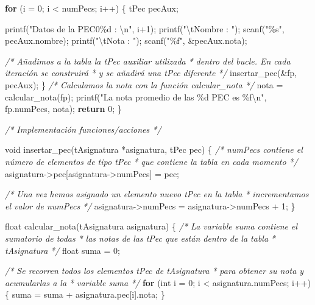 \documentclass[
]{book}
\newenvironment{Shaded}{\begin{snugshade}}{\end{snugshade}}
\newcommand{\CommentTok}[1]{\textcolor[rgb]{0.56,0.35,0.01}{\textit{#1}}}
\newcommand{\ControlFlowTok}[1]{\textcolor[rgb]{0.13,0.29,0.53}{\textbf{#1}}}
\newcommand{\DataTypeTok}[1]{\textcolor[rgb]{0.13,0.29,0.53}{#1}}
\newcommand{\DecValTok}[1]{\textcolor[rgb]{0.00,0.00,0.81}{#1}}
\newcommand{\NormalTok}[1]{#1}
\newcommand{\SpecialCharTok}[1]{\textcolor[rgb]{0.00,0.00,0.00}{#1}}
\newcommand{\StringTok}[1]{\textcolor[rgb]{0.31,0.60,0.02}{#1}}
\begin{document}
\begin{Shaded}
\begin{Highlighting}[]
    \ControlFlowTok{for}\NormalTok{ (i = }\DecValTok{0}\NormalTok{; i \textless{} numPecs; i++) \{}
\NormalTok{        tPec pecAux;}

\NormalTok{        printf(}\StringTok{"Datos de la PEC0\%d : }\SpecialCharTok{\textbackslash{}n}\StringTok{"}\NormalTok{, i+}\DecValTok{1}\NormalTok{);}
\NormalTok{        printf(}\StringTok{"}\SpecialCharTok{\textbackslash{}t}\StringTok{Nombre : "}\NormalTok{);}
\NormalTok{        scanf(}\StringTok{"\%s"}\NormalTok{, pecAux.nombre);}
\NormalTok{        printf(}\StringTok{"}\SpecialCharTok{\textbackslash{}t}\StringTok{Nota : "}\NormalTok{);}
\NormalTok{        scanf(}\StringTok{"\%f"}\NormalTok{, \&pecAux.nota);}

        \CommentTok{/* Añadimos a la tabla la tPec auxiliar utilizada}
\CommentTok{         * dentro del bucle. En cada iteración se construirá}
\CommentTok{         * y se añadirá una tPec diferente}
\CommentTok{         */}
\NormalTok{        insertar\_pec(\&fp, pecAux);}
\NormalTok{    \}}
    \CommentTok{/* Calculamos la nota con la función calcular\_nota */}
\NormalTok{    nota = calcular\_nota(fp);}
\NormalTok{    printf(}\StringTok{"La nota promedio de las \%d PEC es \%f}\SpecialCharTok{\textbackslash{}n}\StringTok{"}\NormalTok{, fp.numPecs, nota);}
    \ControlFlowTok{return} \DecValTok{0}\NormalTok{;}
\NormalTok{\}}

\CommentTok{/* Implementación funciones/acciones */}

\DataTypeTok{void}\NormalTok{ insertar\_pec(tAsignatura *asignatura, tPec pec) \{}
    \CommentTok{/* numPecs contiene el número de elementos de tipo tPec}
\CommentTok{     * que contiene la tabla en cada momento}
\CommentTok{     */}
\NormalTok{    asignatura{-}\textgreater{}pec[asignatura{-}\textgreater{}numPecs] = pec;}

    \CommentTok{/* Una vez hemos asignado un elemento nuevo tPec en la tabla}
\CommentTok{     * incrementamos el valor de numPecs}
\CommentTok{     */}
\NormalTok{    asignatura{-}\textgreater{}numPecs = asignatura{-}\textgreater{}numPecs + }\DecValTok{1}\NormalTok{;}
\NormalTok{\}}

\DataTypeTok{float}\NormalTok{ calcular\_nota(tAsignatura asignatura) \{}
    \CommentTok{/* La variable suma contiene el sumatorio de todas}
\CommentTok{     * las notas de las tPec que están dentro de la tabla}
\CommentTok{     * tAsignatura}
\CommentTok{     */}
    \DataTypeTok{float}\NormalTok{ suma = }\DecValTok{0}\NormalTok{;}

    \CommentTok{/* Se recorren todos los elementos tPec de tAsignatura}
\CommentTok{     * para obtener su nota y acumularlas a la}
\CommentTok{     * variable suma}
\CommentTok{     */}
    \ControlFlowTok{for}\NormalTok{ (}\DataTypeTok{int}\NormalTok{ i = }\DecValTok{0}\NormalTok{; i \textless{} asignatura.numPecs; i++) \{}
\NormalTok{        suma = suma + asignatura.pec[i].nota;}
\NormalTok{    \}}


\end{Highlighting}
\end{Shaded}
\end{document}
